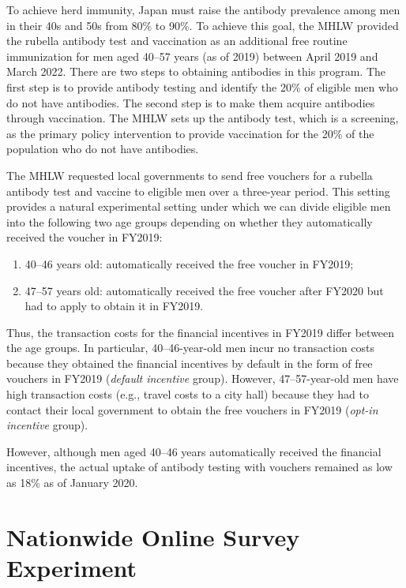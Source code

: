 \documentclass[
      12pt,
    a4paper
]{article}
\providecommand{\tightlist}{%
  \setlength{\itemsep}{0pt}\setlength{\parskip}{0pt}}
\begin{document}
To achieve herd immunity, Japan must raise the antibody prevalence among men in their 40s and 50s from 80\% to 90\%. To achieve this goal, the MHLW provided the rubella antibody test and vaccination as an additional free routine immunization for men aged 40--57 years (as of 2019) between April 2019 and March 2022. There are two steps to obtaining antibodies in this program. The first step is to provide antibody testing and identify the 20\% of eligible men who do not have antibodies. The second step is to make them acquire antibodies through vaccination. The MHLW sets up the antibody test, which is a screening, as the primary policy intervention to provide vaccination for the 20\% of the population who do not have antibodies.

The MHLW requested local governments to send free vouchers for a rubella antibody test and vaccine to eligible men over a three-year period. This setting provides a natural experimental setting under which we can divide eligible men into the following two age groups depending on whether they automatically received the voucher in FY2019:

\begin{enumerate}
\def\labelenumi{\arabic{enumi}.}
\tightlist
\item
  40--46 years old: automatically received the free voucher in FY2019;
\item
  47--57 years old: automatically received the free voucher after FY2020 but had to apply to obtain it in FY2019.
\end{enumerate}

Thus, the transaction costs for the financial incentives in FY2019 differ between the age groups. In particular, 40--46-year-old men incur no transaction costs because they obtained the financial incentives by default in the form of free vouchers in FY2019 (\emph{default incentive} group). However, 47--57-year-old men have high transaction costs (e.g., travel costs to a city hall) because they had to contact their local government to obtain the free vouchers in FY2019 (\emph{opt-in incentive} group).

However, although men aged 40--46 years automatically received the financial incentives, the actual uptake of antibody testing with vouchers remained as low as 18\% as of January 2020.

\hypertarget{experiment}{%
\section{Nationwide Online Survey Experiment}\label{experiment}}
\end{document}
